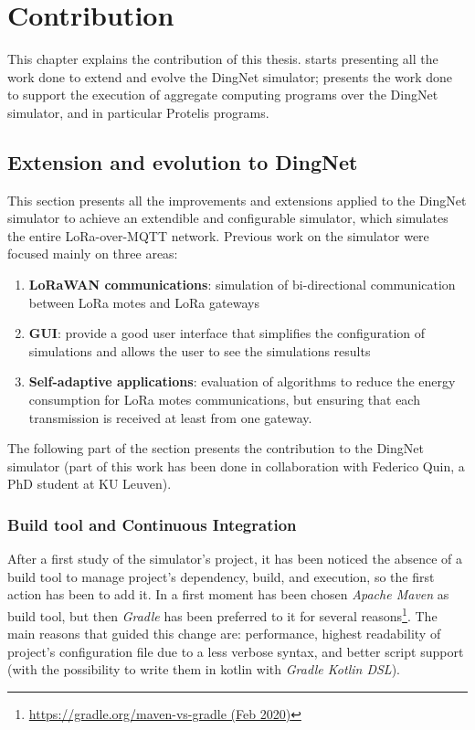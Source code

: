 \chapter{Contribution}
\label{chap:contribution}
This chapter explains the contribution of this thesis.  starts presenting all the work done to extend and evolve the DingNet simulator;  presents  the work done to support the execution of aggregate computing programs over the DingNet simulator, and in particular Protelis programs. 

\section{Extension and evolution to DingNet}
\label{sec:contributionDingNet}
This section presents all the improvements and extensions applied to the DingNet simulator to achieve an extendible and configurable simulator, which simulates the entire LoRa-over-MQTT network. 
Previous work on the simulator were focused mainly on three areas:
\begin{enumerate}
    \item \textbf{LoRaWAN communications}: simulation of bi-directional communication between LoRa motes and LoRa gateways
    \item \textbf{GUI}: provide a good user interface that simplifies the configuration of simulations and allows the user to see the simulations results
    \item \textbf{Self-adaptive applications}: evaluation of algorithms to reduce the energy consumption for LoRa motes communications, but ensuring that each transmission is received at least from one gateway.
\end{enumerate}
The following part of the section presents the contribution to the DingNet simulator (part of this work has been done in collaboration with Federico Quin, a PhD student at KU Leuven).
\clearpage
\subsection{Build tool and Continuous Integration}
After a first study of the simulator's project, it has been noticed the absence of a build tool to manage project's dependency, build, and execution, so the first action has been to add it. 
In a first moment has been chosen \textit{Apache Maven} as build tool, but then \textit{Gradle} has been preferred to it for several reasons\footnote{ \href{https://gradle.org/maven-vs-gradle/}{https://gradle.org/maven-vs-gradle (Feb 2020)}}. The main reasons that guided this change are: performance, highest readability of project's configuration file due to a less verbose syntax, and better script support (with the possibility to write them in kotlin with \textit{Gradle Kotlin DSL}). 

